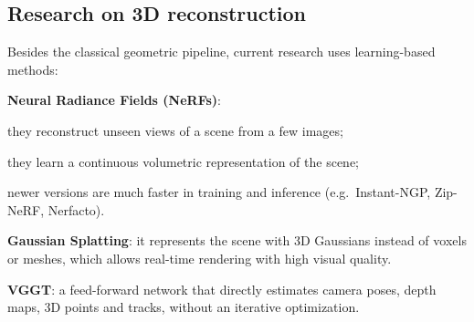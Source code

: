 \subsection{Research on 3D reconstruction}
Besides the classical geometric pipeline, current research uses learning-based methods:
\begin{compactitemize}
    \item \textbf{Neural Radiance Fields (NeRFs)}:
    \begin{compactitemize}
        \item they reconstruct unseen views of a scene from a few images;
        \item they learn a continuous volumetric representation of the scene;
        \item newer versions are much faster in training and inference (e.g.\ Instant-NGP, Zip-NeRF, Nerfacto).
    \end{compactitemize}
    \item \textbf{Gaussian Splatting}: it represents the scene with 3D Gaussians instead of voxels or meshes, which allows real-time rendering with high visual quality.
    \item \textbf{VGGT}: a feed-forward network that directly estimates camera poses, depth maps, 3D points and tracks, without an iterative optimization.
\end{compactitemize}
